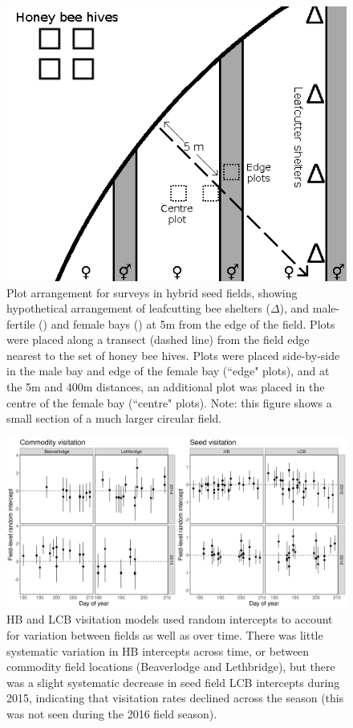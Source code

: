 \documentclass[12pt]{article} %
\begin{document}
\begin{figure}[h]
    \centering
    \includegraphics[width=\textwidth,keepaspectratio=true]{seedfieldPlots.png}
    \caption[Plot arrangement for surveys in hybrid seed fields]{Plot arrangement for surveys in hybrid seed fields, showing hypothetical arrangement of leafcutting bee shelters ($\Delta$), and male-fertile (\Hermaphrodite) and female bays (\Female) at 5m from the edge of the field. Plots were placed along a transect (dashed line) from the field edge nearest to the set of honey bee hives. Plots were placed side-by-side in the male bay and edge of the female bay (``edge" plots), and at the 5m and 400m distances, an additional plot was placed in the centre of the female bay (``centre" plots). Note: this figure shows a small section of a much larger circular field.}
\end{figure}

\begin{figure}[h]
    \centering
    \includegraphics[width=\textwidth,keepaspectratio=true]{both_beeInt_time.png}
    \caption[Visitation model intercepts over time]{HB and LCB visitation models used random intercepts to account for variation between fields as well as over time. There was little systematic variation in HB intercepts across time, or between commodity field locations (Beaverlodge and Lethbridge), but there was a slight systematic decrease in seed field LCB intercepts during 2015, indicating that visitation rates declined across the season (this was not seen during the 2016 field season).}
\end{figure}
\end{document}
